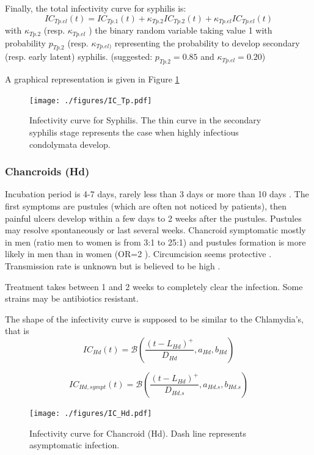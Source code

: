 \documentclass[11pt, onecolumn]{article}
\begin{document}
Finally, the total infectivity curve for syphilis is:
$$IC_{Tp.el}(t) = IC_{Tp.1}(t) +\kappa_{Tp.2}IC_{Tp.2}(t) +\kappa_{Tp.el}IC_{Tp.el}(t) $$
with $\kappa_{Tp.2}$ (resp. $\kappa_{Tp.el}$ ) the binary random variable taking value 1 with probability $p_{Tp.2}$ (resp. $\kappa_{Tp.el)}$ representing the probability to develop secondary (resp. early latent) syphilis. (suggested: $p_{Tp.2}=0.85$ and $\kappa_{Tp.el}=0.20$)

A graphical representation is given in Figure \ref{fig:ICTp}

\begin{figure}[!ht]
\centering
    \texttt{[image: ./figures/IC\_Tp.pdf]}
\caption{Infectivity curve for Syphilis. The thin curve in the secondary syphilis stage represents the case when highly infectious condolymata develop.}
\label{fig:ICTp}
\end{figure} 

\subsubsection{Chancroids (Hd)}

 Incubation period is 4-7 days, rarely less than 3 days or more than 10 days \cite{Sakuma:2011gx,Morse:1989io}. The first symptoms are pustules (which are often not noticed by patients), then painful ulcers develop within a few days to 2 weeks \cite{Sakuma:2011gx} after the pustules. Pustules may resolve spontaneously or last several weeks\cite{Spinola:2002kn}. Chancroid symptomatic mostly in men (ratio men to women is from 3:1 to 25:1) \cite{Sakuma:2011gx} and pustules formation is more likely in men than in women (OR=2 \cite{Spinola:2002kn}).
Circumcision seems protective \cite{Hammond:1980uz}. Transmission rate is unknown but is believed to be high \cite{Spinola:2002kn}. 

Treatment takes between 1 and 2 weeks to completely clear the infection. Some strains may be antibiotics resistant.


The shape of the infectivity curve is supposed to be similar to the Chlamydia's, that is
$$IC_{Hd}(t) = \mathcal{B}\left(\frac{(t-L_{Hd})^+}{D_{Hd}},a_{Hd},b_{Hd}\right)$$

$$IC_{Hd,sympt}(t) = \mathcal{B}\left(\frac{(t-L_{Hd})^+}{D_{Hd.s}},a_{Hd.s},b_{Hd.s}\right)$$

\begin{figure}[!ht]
\centering
   \texttt{[image: ./figures/IC\_Hd.pdf]}
\caption{Infectivity curve for Chancroid (Hd). Dash line represents asymptomatic infection.}
\label{fig:ICHd}
\end{figure}
\end{document}
